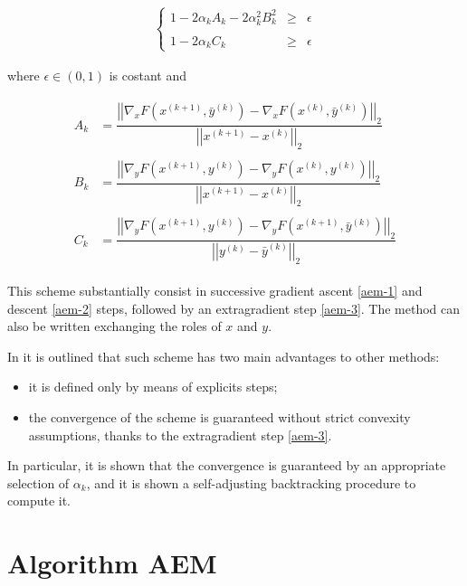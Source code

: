 \begin{align}
\left\{ \begin{array}{lll}
1-2\alpha_k A_k - 2 \alpha_k^2 B_k^2 & \geq & \epsilon \\
\\
1-2\alpha_k C_k & \geq & \epsilon \end{array} \right.
\end{align}


where $\epsilon \in (0,1)$ is costant and

\begin{align}
\begin{aligned}
A_k &= \dfrac{\left|\left|\nabla_x F\left(x^{(k+1)},\bar{y}^{(k)}\right) - \nabla_x F\left(x^{(k)},\bar{y}^{(k)}\right)\right|\right|_2}{\left|\left|x^{(k+1)}-x^{(k)}\right|\right|_2} \\
\\
B_k &= \dfrac{\left|\left|\nabla_y F\left(x^{(k+1)},y^{(k)}\right) - \nabla_y F\left(x^{(k)},y^{(k)}\right)\right|\right|_2}{\left|\left|x^{(k+1)}-x^{(k)}\right|\right|_2} \\
\\
C_k &= \dfrac{\left|\left|\nabla_y F\left(x^{(k+1)},y^{(k)}\right) - \nabla_y F\left(x^{(k+1)},\bar{y}^{(k)}\right)\right|\right|_2}{\left|\left|y^{(k)}-\bar{y}^{(k)}\right|\right|_2}
\end{aligned}
\end{align}

This scheme substantially consist in successive gradient ascent \eqref{aem-1} and descent \eqref{aem-2} steps, followed by an extragradient step \eqref{aem-3}. The method can also be written exchanging the roles of $x$ and $y$.

In \citep{aem} it is outlined that such scheme has two main advantages to other methods:

\begin{itemize}
 \item it is defined only by means of explicits steps;
 \item the convergence of the scheme is guaranteed without strict convexity assumptions, thanks to the extragradient step \eqref{aem-3}.
\end{itemize}

In particular, it is shown that the convergence is guaranteed by an appropriate selection of $\alpha_k$, and it is shown a self-adjusting backtracking procedure to compute it.

\section{Algorithm AEM}

